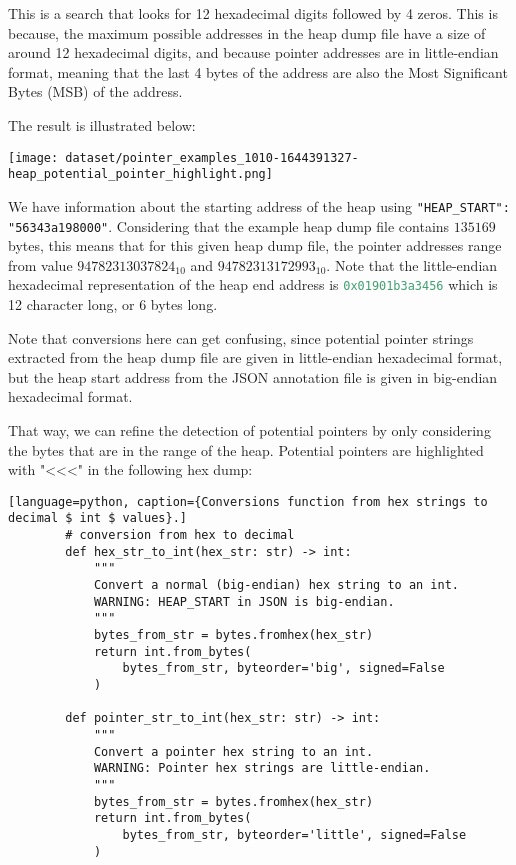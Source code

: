     This is a search that looks for 12 hexadecimal digits followed by 4 zeros. This is because, the maximum possible addresses in the heap dump file have a size of around 12 hexadecimal digits, and because pointer addresses are in little-endian format, meaning that the last 4 bytes of the address are also the Most Significant Bytes (MSB) of the address. 
    
    The result is illustrated below:

    \texttt{[image: dataset/pointer\_examples\_1010-1644391327-heap\_potential\_pointer\_highlight.png]}

    We have information about the starting address of the heap using \lstinline[style=json]!"HEAP_START": "56343a198000"!. Considering that the example heap dump file contains $ 135169 $ bytes, this means that for this given heap dump file, the pointer addresses range from value $ 94782313037824_{10} $ and $ 94782313172993_{10} $. Note that the little-endian hexadecimal representation of the heap end address is \lstinline[language=c]!0x01901b3a3456! which is 12 character long, or 6 bytes long.

    Note that conversions here can get confusing, since potential pointer strings extracted from the heap dump file are given in little-endian hexadecimal format, but the heap start address from the JSON annotation file is given in big-endian hexadecimal format.

    \begin{minipage}{\dimexpr\linewidth-20pt}
        That way, we can refine the detection of potential pointers by only considering the bytes that are in the range of the heap. Potential pointers are highlighted with "<<<" in the following hex dump:

        \begin{lstlisting}[language=python, caption={Conversions function from hex strings to decimal $ int $ values}.]
        # conversion from hex to decimal
        def hex_str_to_int(hex_str: str) -> int:
            """
            Convert a normal (big-endian) hex string to an int.
            WARNING: HEAP_START in JSON is big-endian.
            """
            bytes_from_str = bytes.fromhex(hex_str)
            return int.from_bytes(
                bytes_from_str, byteorder='big', signed=False
            )
        
        def pointer_str_to_int(hex_str: str) -> int:
            """
            Convert a pointer hex string to an int.
            WARNING: Pointer hex strings are little-endian.
            """
            bytes_from_str = bytes.fromhex(hex_str)
            return int.from_bytes(
                bytes_from_str, byteorder='little', signed=False
            )
        \end{lstlisting}
    \end{minipage}

